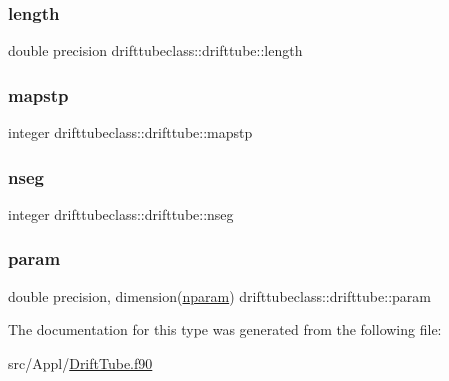 \subsubsection{\texorpdfstring{length}{length}}
{\footnotesize\ttfamily double precision drifttubeclass\+::drifttube\+::length}

\mbox{\label{structdrifttubeclass_1_1drifttube_a32a529cb8bf2da679620c46a2ac0bd6d}} 
\subsubsection{\texorpdfstring{mapstp}{mapstp}}
{\footnotesize\ttfamily integer drifttubeclass\+::drifttube\+::mapstp}

\mbox{\label{structdrifttubeclass_1_1drifttube_ac9c97374879fd6cd44d8ff391152ce6f}} 
\subsubsection{\texorpdfstring{nseg}{nseg}}
{\footnotesize\ttfamily integer drifttubeclass\+::drifttube\+::nseg}

\mbox{\label{structdrifttubeclass_1_1drifttube_abc755647bb29543bf6f4d65f7af740d4}} 
\subsubsection{\texorpdfstring{param}{param}}
{\footnotesize\ttfamily double precision, dimension(\mbox{\hyperlink{namespacedrifttubeclass_af382d7cef81496c1d2c2bf3ba72c4350}{nparam}}) drifttubeclass\+::drifttube\+::param}



The documentation for this type was generated from the following file\+:\begin{DoxyCompactItemize}
\item 
src/\+Appl/\mbox{\hyperlink{_drift_tube_8f90}{Drift\+Tube.\+f90}}\end{DoxyCompactItemize}
